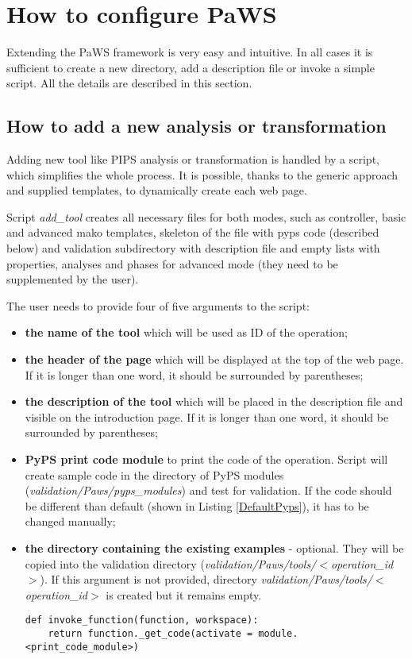 \section{How to configure PaWS}

Extending the PaWS framework is very easy and intuitive. In all cases it is sufficient to create a new directory, add a description file or invoke a simple script. All the details are described in this section.

\subsection{How to add a new analysis or transformation}
\label{add_analysis_transformation}

Adding new tool like PIPS analysis or transformation is handled by a script, which simplifies the whole process. It is possible, thanks to the generic approach and supplied templates, to dynamically create each web page.

Script \emph{add\_tool} creates all necessary files for both modes, such as controller, basic and advanced mako templates, skeleton of the file with pyps code (described below) and validation subdirectory with description file and empty lists with properties, analyses and phases for advanced mode (they need to be supplemented by the user).

The user needs to provide four of five arguments to the script:

\begin{itemize}
  \item {\bf the name of the tool} which will be used as ID of the operation;
  \item {\bf the header of the page} which will be displayed at the top of the web page. If it is longer than one word, it should be surrounded by parentheses;
  \item {\bf the description of the tool} which will be placed in the description file and visible on the introduction page. If it is longer than one word, it should be surrounded by parentheses;
  \item {\bf PyPS print code module} to print the code of the operation. Script will create sample code in the directory of PyPS modules (\emph{validation/Paws/pyps\_modules}) and test for validation. If the code should be different than default (shown in Listing \ref{DefaultPyps}), it has to be changed manually;
  \item {\bf the directory containing the existing examples} - optional. They will be copied into the validation directory (\emph{validation/Paws/tools/$<$operation\_id$>$}). If this argument is not provided, directory \emph{validation/Paws/tools/$<$operation\_id$>$} is created but it remains empty.
  
\begin{lstlisting}
def invoke_function(function, workspace):
	return function._get_code(activate = module.<print_code_module>)
\end{lstlisting}
  
\end{itemize}

